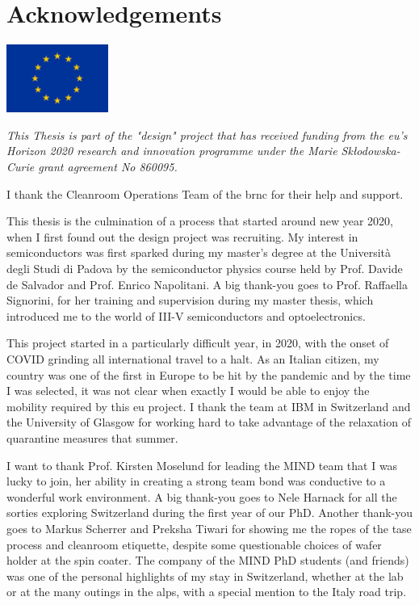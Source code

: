 \chapter{Acknowledgements}

\begin{center}
    \includegraphics[width=0.25\textwidth]{0_Abstract/EU_Flag.pdf}
\end{center}

\noindent \textit{This Thesis is part of the "\acl{design}" project that has received funding from the \acl{eu}'s Horizon 2020 research and innovation programme under the Marie Skłodowska-Curie grant agreement No 860095.}

I thank the Cleanroom Operations Team of the \acl{brnc} for their help and support.
\vspace{\baselineskip}


\noindent This thesis is the culmination of a process that started around new year 2020, when I first found out the \acs{design} project was recruiting. My interest in semiconductors was first sparked during my master's degree at the Università degli Studi di Padova by the semiconductor physics course held by Prof. Davide de Salvador and Prof. Enrico Napolitani. A big thank-you goes to Prof. Raffaella Signorini, for her training and supervision during my master thesis, which introduced me to the world of III-V semiconductors and optoelectronics.

This project started in a particularly difficult year, in 2020, with the onset of COVID grinding all international travel to a halt. As an Italian citizen, my country was one of the first in Europe to be hit by the pandemic and by the time I was selected, it was not clear when exactly I would be able to enjoy the mobility required by this \acs{eu} project. I thank the team at IBM in Switzerland and the University of Glasgow for working hard to take advantage of the relaxation of quarantine measures that summer. 

I want to thank Prof. Kirsten Moselund for leading the MIND team that I was lucky to join, her ability in creating a strong team bond was conductive to a wonderful work environment. A big thank-you goes to Nele Harnack for all the sorties exploring Switzerland during the first year of our PhD. Another thank-you goes to Markus Scherrer and Preksha Tiwari for showing me the ropes of the \acs{tase} process and cleanroom etiquette, despite some questionable choices of wafer holder at the spin coater. The company of the MIND PhD students (and friends) was one of the personal highlights of my stay in Switzerland, whether at the lab or at the many outings in the alps, with a special mention to the Italy road trip.

